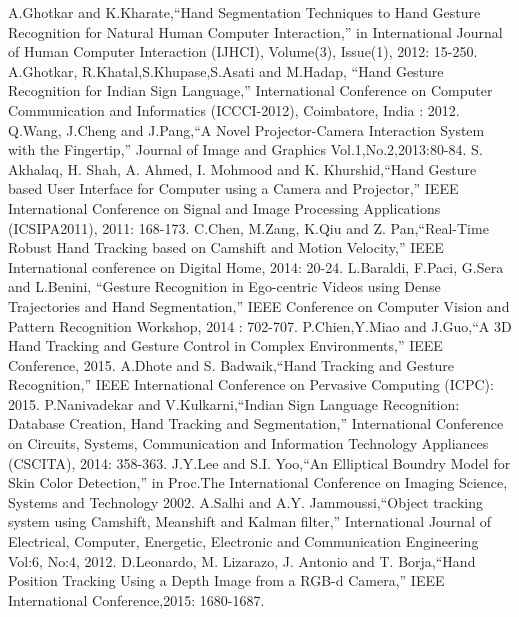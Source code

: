 \documentclass[oneside,a4paper,12pt]{pictreport}
\begin{document}
\begin{thebibliography}{1}
 A.Ghotkar and K.Kharate,“Hand Segmentation Techniques to Hand Gesture Recognition for Natural Human Computer Interaction,” in International Journal of Human Computer Interaction (IJHCI), Volume(3), Issue(1), 2012: 15-250.
 A.Ghotkar, R.Khatal,S.Khupase,S.Asati and M.Hadap, “Hand Gesture Recognition for Indian Sign Language,” International Conference on Computer Communication and Informatics (ICCCI-2012), Coimbatore, India : 2012.
 Q.Wang, J.Cheng and J.Pang,“A Novel Projector-Camera Interaction System with the Fingertip,” Journal of Image and Graphics Vol.1,No.2,2013:80-84.
 S. Akhalaq, H. Shah, A. Ahmed, I. Mohmood and K. Khurshid,“Hand Gesture based User Interface for Computer using a Camera and Projector,” 	IEEE International Conference on Signal and Image Processing Applications (ICSIPA2011), 2011: 168-173.
 C.Chen, M.Zang, K.Qiu and Z. Pan,“Real-Time Robust Hand Tracking based on Camshift and Motion Velocity,” IEEE International conference on Digital Home, 2014: 20-24.
 L.Baraldi, F.Paci, G.Sera and L.Benini, “Gesture Recognition in Ego-centric Videos using Dense Trajectories and Hand Segmentation,” IEEE Conference on Computer Vision and Pattern Recognition Workshop, 2014 : 702-707.
 P.Chien,Y.Miao and J.Guo,“A 3D Hand Tracking and Gesture Control in Complex Environments,” IEEE Conference, 2015.
  A.Dhote and S. Badwaik,“Hand Tracking and Gesture Recognition,” IEEE International Conference on Pervasive Computing (ICPC): 2015.
 P.Nanivadekar and V.Kulkarni,“Indian Sign Language Recognition: Database Creation, Hand Tracking and Segmentation,” International Conference on Circuits, Systems, Communication and Information Technology Appliances (CSCITA), 2014: 358-363.
 J.Y.Lee and S.I. Yoo,“An Elliptical Boundry Model for Skin Color Detection,” in Proc.The International Conference on Imaging Science, Systems and Technology 2002.
 A.Salhi and A.Y. Jammoussi,“Object tracking system using Camshift, Meanshift and Kalman filter,” International Journal of Electrical, Computer, Energetic, Electronic and Communication Engineering Vol:6, No:4, 2012.
 D.Leonardo, M. Lizarazo, J. Antonio and T. Borja,“Hand Position Tracking Using a Depth Image from a RGB-d Camera,” IEEE International Conference,2015: 1680-1687.  
\end{thebibliography}
\end{document}
